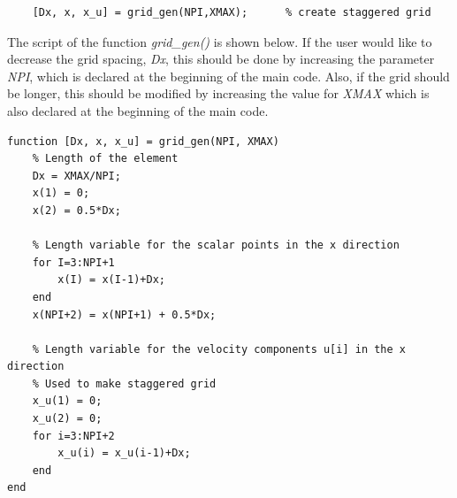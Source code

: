 \begin{lstlisting}[firstnumber={55}]
	%% grid generation
	[Dx, x, x_u] = grid_gen(NPI,XMAX);      % create staggered grid
\end{lstlisting} 

The script of the function \textit{grid\_gen()} is shown below. If the user would like to decrease the grid spacing, \textit{Dx}, this should be done by increasing the parameter \textit{NPI}, which is declared at the beginning of the main code. Also, if the grid should be longer, this should be modified by increasing the value for \textit{XMAX} which is also declared at the beginning of the main code.
\begin{lstlisting}
function [Dx, x, x_u] = grid_gen(NPI, XMAX)
	% Length of the element
	Dx = XMAX/NPI;
	x(1) = 0;
	x(2) = 0.5*Dx;
	
	% Length variable for the scalar points in the x direction
	for I=3:NPI+1
		x(I) = x(I-1)+Dx;
	end
	x(NPI+2) = x(NPI+1) + 0.5*Dx;

	% Length variable for the velocity components u[i] in the x direction
	% Used to make staggered grid
	x_u(1) = 0;
	x_u(2) = 0;
	for i=3:NPI+2
		x_u(i) = x_u(i-1)+Dx;
	end   
end
\end{lstlisting}

